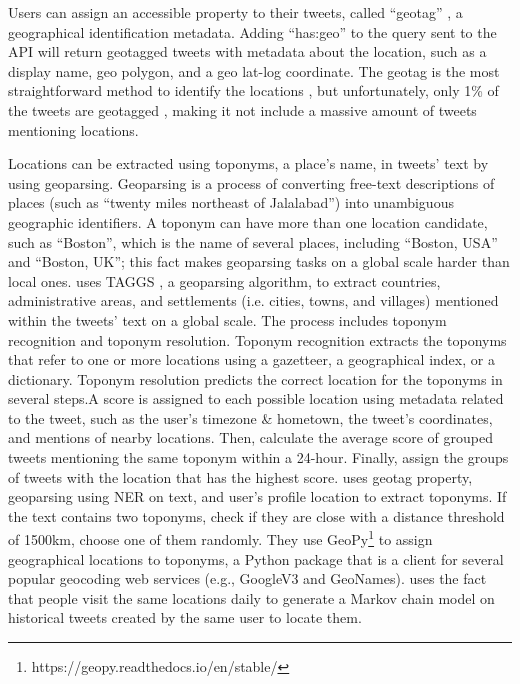 Users can assign an accessible property to their tweets, called ``geotag'' , a geographical
identification metadata. Adding ``has:geo'' to the query sent to the API will return geotagged
tweets with metadata about the location, such as a display name, geo polygon, and a geo lat-log
coordinate. The geotag is the most straightforward method to identify the locations 
\cite{fengExtractionPluvialFlood2018}, but unfortunately, only 1\% of the tweets are geotagged
\cite{middletonLocationExtractionSocial2018}, making it not include a massive amount of tweets
mentioning locations.

Locations can be extracted using toponyms, a place's name, in tweets' text by using geoparsing.
Geoparsing is a process of converting free-text descriptions of places
(such as ``twenty miles northeast of Jalalabad'') into unambiguous geographic identifiers. A toponym
can have more than one location candidate, such as ``Boston'', which is the name of several places,
including ``Boston, USA'' and ``Boston, UK''; this fact makes geoparsing tasks on a global scale
harder than local ones.  uses TAGGS
, a geoparsing algorithm, to extract countries,
administrative areas, and settlements (i.e. cities, towns, and villages) mentioned within the tweets'
text on a global scale. The process includes toponym recognition and toponym resolution.  Toponym
recognition extracts the toponyms that refer to one or more locations using a gazetteer, a
geographical index, or a dictionary. Toponym resolution predicts the correct location for the
toponyms in several steps.A score is assigned to each possible location using metadata related to
the tweet, such as the user's timezone \& hometown, the tweet's coordinates, and mentions of nearby
locations. Then, calculate the average score of grouped tweets mentioning the same toponym within a
24-hour. Finally, assign the groups of tweets with the location that has the highest score.
 uses geotag property, geoparsing using
\ac{NER} on text, and user's profile location to extract toponyms. If the text contains two
toponyms, check if they are close with a distance threshold of 1500km, choose one of them randomly.
They use GeoPy\footnote{https://geopy.readthedocs.io/en/stable/} to assign geographical locations to
toponyms, a Python package that is a client for several popular geocoding web services (e.g.,
GoogleV3 and GeoNames).  uses the fact that people
visit the same locations daily to generate a Markov chain model on historical tweets created by the
same user to locate them.

